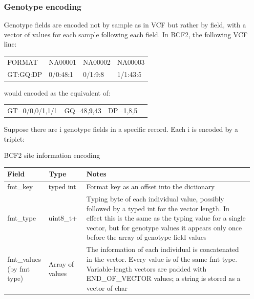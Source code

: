 \documentclass[8pt]{article}
\begin{document}
\subsubsection{Genotype encoding}
\label{GenotypeEncoding}

Genotype fields are encoded not by sample as in VCF but rather by field, with a vector of values for each sample following each field.
In BCF2, the following VCF line:

\vspace{0.3cm}
\begin{tabular}{l l l l}
FORMAT & NA00001 & NA00002 & NA00003 \\
GT:GQ:DP & 0/0:48:1 & 0/1:9:8 & 1/1:43:5 \\
\end{tabular}
\vspace{0.3cm}

would encoded as the equivalent of:

\vspace{0.3cm}
\begin{tabular}{l l l l}
GT=0/0,0/1,1/1 & GQ=48,9,43 & DP=1,8,5
\end{tabular}
\vspace{0.3cm}

Suppose there are i genotype fields in a specific record.
Each i is encoded by a triplet:

BCF2 site information encoding

\vspace{0.3cm}
\small
\begin{tabular}{ | p{2cm} | p{2.5cm} | p{9.5cm} | } \hline
Field & Type & Notes \\ \hline
fmt\_key & typed int & Format key as an offset into the dictionary \\ \hline
fmt\_type & uint8\_t+ & Typing byte of each individual value, possibly followed by a typed int for the vector length.  
In effect this is the same as the typing value for a single vector, but for genotype values it appears only once before the array of genotype field values \\ \hline
\makecell[tl]{fmt\_values \\ (by fmt type)} & Array of values & The information of each individual is concatenated in the vector.  Every value is of the same fmt type.
Variable-length vectors are padded with END\_OF\_VECTOR values; a string is stored as a vector of char \\  \hline
\end{tabular}
\normalsize
\vspace{0.3cm}
\end{document}
